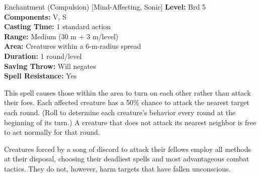 {Enchantment (Compulsion) [Mind-Affecting, Sonic]}
{
	\textbf{Level:}
	Brd 5\\
	\textbf{Components:}
	V, S\\
	\textbf{Casting Time:}
	1 standard action\\
	\textbf{Range:}
	Medium (30 m + 3 m/level)\\
	\textbf{Area:}
	Creatures within a 6-m-radius spread\\
	\textbf{Duration:}
	1 round/level\\
	\textbf{Saving Throw:}
	Will negates\\
	\textbf{Spell Resistance:}
	Yes\\
}
{
	This spell causes those within the area to turn on each other rather than attack their foes. Each affected creature has a 50\% chance to attack the nearest target each round. (Roll to determine each creature's behavior every round at the beginning of its turn.) A creature that does not attack its nearest neighbor is free to act normally for that round.

	Creatures forced by a song of discord to attack their fellows employ all methods at their disposal, choosing their deadliest spells and most advantageous combat tactics. They do not, however, harm targets that have fallen unconscious.

}
